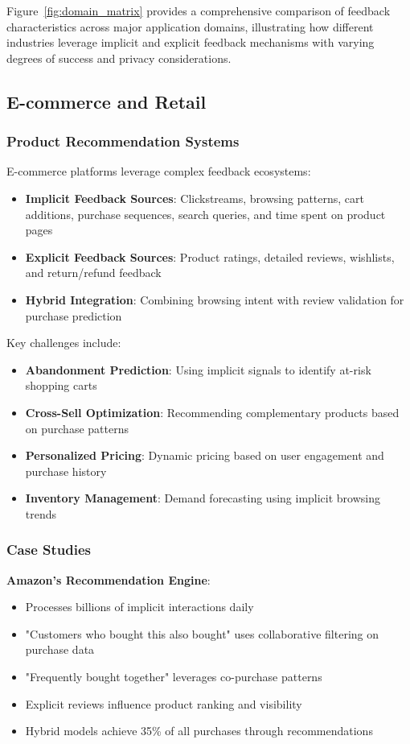Figure~\ref{fig:domain_matrix} provides a comprehensive comparison of feedback characteristics across major application domains, illustrating how different industries leverage implicit and explicit feedback mechanisms with varying degrees of success and privacy considerations.

\subsection{E-commerce and Retail}

\subsubsection{Product Recommendation Systems}

E-commerce platforms leverage complex feedback ecosystems:

\begin{itemize}
    \item \textbf{Implicit Feedback Sources}: Clickstreams, browsing patterns, cart additions, purchase sequences, search queries, and time spent on product pages
    \item \textbf{Explicit Feedback Sources}: Product ratings, detailed reviews, wishlists, and return/refund feedback
    \item \textbf{Hybrid Integration}: Combining browsing intent with review validation for purchase prediction
\end{itemize}

Key challenges include:
\begin{itemize}
    \item \textbf{Abandonment Prediction}: Using implicit signals to identify at-risk shopping carts
    \item \textbf{Cross-Sell Optimization}: Recommending complementary products based on purchase patterns
    \item \textbf{Personalized Pricing}: Dynamic pricing based on user engagement and purchase history
    \item \textbf{Inventory Management}: Demand forecasting using implicit browsing trends
\end{itemize}

\subsubsection{Case Studies}

\textbf{Amazon's Recommendation Engine}:
\begin{itemize}
    \item Processes billions of implicit interactions daily
    \item "Customers who bought this also bought" uses collaborative filtering on purchase data
    \item "Frequently bought together" leverages co-purchase patterns
    \item Explicit reviews influence product ranking and visibility
    \item Hybrid models achieve 35\% of all purchases through recommendations
\end{itemize}

